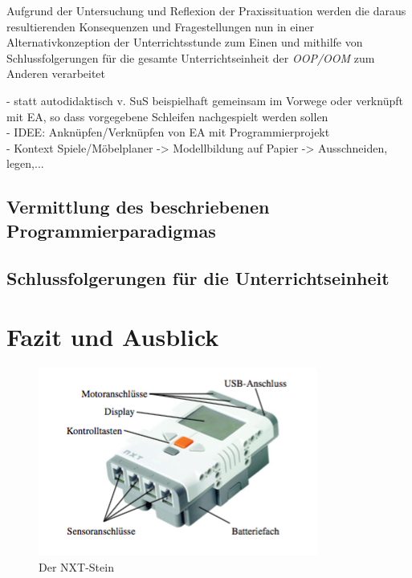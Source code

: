 \documentclass[paper=a4, DIV=13, BCOR=12mm, twoside=on, onecolumn=on, open = any, titlepage =on, parskip =half-, headsepline = on, footsepline = on, chapterprefix = on, sectionprefix = on, appendixprefix = off, fontsize = 11pt, numbers = noenddot, abstract = off]{scrreprt}
\begin{document}
Aufgrund der Untersuchung und Reflexion der Praxissituation werden die daraus resultierenden Konsequenzen und Fragestellungen nun in einer Alternativkonzeption der Unterrichtsstunde zum Einen und mithilfe von Schlussfolgerungen für die gesamte Unterrichtseinheit der \emph{OOP/OOM} zum Anderen verarbeitet 

- statt autodidaktisch v. SuS beispielhaft gemeinsam im Vorwege oder verknüpft mit EA, so dass vorgegebene Schleifen nachgespielt werden sollen\\
- IDEE: Anknüpfen/Verknüpfen von EA mit Programmierprojekt\\
- Kontext Spiele/Möbelplaner -> Modellbildung auf Papier -> Ausschneiden, legen,...

\par \singlespacing
 \section{Vermittlung des beschriebenen Programmierparadigmas}
\onehalfspacing



\par \singlespacing
 \section{Schlussfolgerungen für die Unterrichtseinheit}
\onehalfspacing

\newpage
\chapter{Fazit und Ausblick}
\onehalfspacing

\begin{figure}[htb]
\centering
\includegraphics[scale=0.7]{images/NXT-Stein.png} 
\caption[Der NXT-Stein]{Der NXT-Stein \cite[S. 42]{berns:10}}
\label{fig:NXT Stein}
\end{figure}
\end{document}
